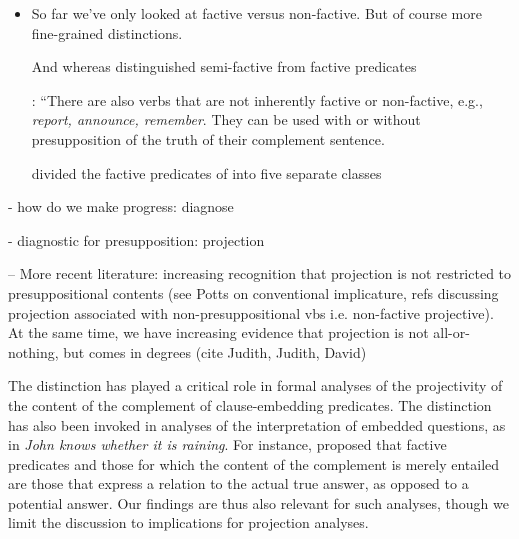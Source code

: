 \documentclass[11pt,fleqn]{article}
\newcommand{\6}{\mbox{$[\hspace*{-.6mm}[$}}
\newcommand{\9}{\mbox{$]\hspace*{-.6mm}]$}}
\begin{document}
\begin{itemize}
\begin{exe}
\begin{xlist}
\end{xlist}

\end{exe}

\newpage

\item So far we've only looked at factive versus non-factive. But of course more fine-grained distinctions.

And whereas \citet{karttunen71b}  distinguished  semi-factive from factive predicates

\citealt[340]{karttunen71-implicative}: ``There are also verbs that are not inherently factive or non-factive, e.g., {\em report, announce, remember}. They can be used with or without presupposition of the truth of their complement sentence.

\citet{karttunen2016} divided the factive  predicates of \citealt{kiparsky-kiparsky70} into five separate classes

\end{itemize}

- how do we make progress: diagnose

- diagnostic for presupposition: projection

-- More recent literature: increasing recognition that projection is not restricted to presuppositional contents (see Potts on conventional implicature, refs discussing projection associated with non-presuppositional vbs i.e. non-factive projective). At the same time, we have increasing evidence that projection is not all-or-nothing, but comes in degrees (cite Judith, Judith, David)

\newpage

The distinction has played a critical role in formal analyses of the projectivity of the content of the complement of clause-embedding predicates. The distinction has also been invoked in analyses of the interpretation of embedded questions, as in {\em John knows whether it is raining}. For instance, \citet{spector-egre2015} proposed that factive predicates and those for which the content of the complement is merely entailed are those that express a relation to the actual true answer, as opposed to a potential answer. Our findings are thus also relevant for such analyses, though we limit the discussion to implications for projection analyses.

\newpage
\end{document}
